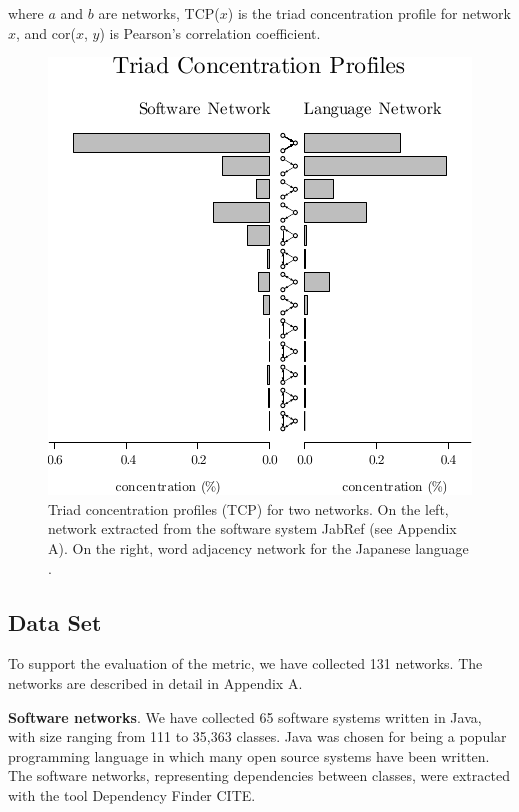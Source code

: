 where $a$ and $b$ are networks, TCP($x$) is the triad concentration profile for
network $x$, and cor($x$, $y$) is Pearson's correlation coefficient.

\begin{figure}[!t]
\center
\includegraphics{tcp}
\caption{Triad concentration profiles (TCP) for two networks. On the left,
network extracted from the software system JabRef (see Appendix A). On the
right, word adjacency network for the Japanese language \cite{Milo2004}.}
\label{fig:profiles}
\end{figure}

\subsection{Data Set}

To support the evaluation of the metric, we have collected 131 networks. The
networks are described in detail in Appendix A.

\textbf{Software networks}. We have collected 65 software systems written in
Java, with size ranging from 111 to 35,363 classes. Java was chosen for being a
popular programming language in which many open source systems have been
written. The software networks, representing dependencies between classes, were
extracted with the tool Dependency Finder CITE.

